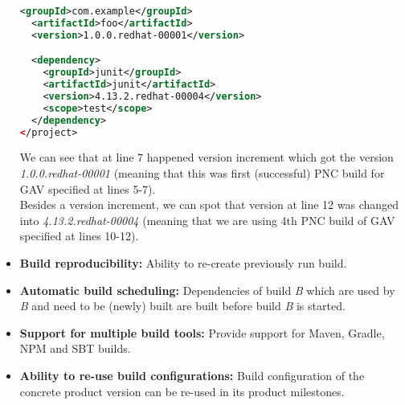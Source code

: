 \documentclass[../main.tex]{subfiles}
\begin{document}
\begin{itemize}
\begin{lstlisting}[language=XML, caption=Same pom.xml after alignment operation]
  <groupId>com.example</groupId>
  <artifactId>foo</artifactId>
  <version>1.0.0.redhat-00001</version>

  <dependency>
    <groupId>junit</groupId>
    <artifactId>junit</artifactId>
    <version>4.13.2.redhat-00004</version>
    <scope>test</scope>
  </dependency>
</project>
\end{lstlisting}

  We can see that at line 7 happened version increment which got the version \textit{1.0.0.redhat-00001} (meaning that this was first (successful) PNC build for GAV specified at lines 5-7).\\
  Besides a version increment, we can spot that version at line 12 was changed into \textit{4.13.2.redhat-00004} (meaning that we are using 4th PNC build of GAV specified at lines 10-12).

  \item \textbf{Build reproducibility:} Ability to re-create previously run build.

  \item \textbf{Automatic build scheduling:} Dependencies of build \textit{B} which are used by \textit{B} and need to be (newly) built are built before build \textit{B} is started.

  \item \textbf{Support for multiple build tools:} Provide support for Maven, Gradle, NPM and SBT builds.

  \item \textbf{Ability to re-use build configurations:} Build configuration of the concrete product version can be re-used in its product milestones.

\end{itemize}
\end{document}
